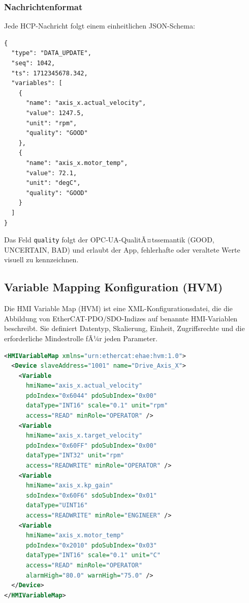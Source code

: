 ﻿\documentclass[12pt,a4paper]{article}
\begin{document}
\subsubsection{Nachrichtenformat}

Jede HCP-Nachricht folgt einem einheitlichen JSON-Schema:

\begin{lstlisting}[language={}, caption={HCP-Nachrichtenformat (Beispiel: DATA\_UPDATE).}]
{
  "type": "DATA_UPDATE",
  "seq": 1042,
  "ts": 1712345678.342,
  "variables": [
    {
      "name": "axis_x.actual_velocity",
      "value": 1247.5,
      "unit": "rpm",
      "quality": "GOOD"
    },
    {
      "name": "axis_x.motor_temp",
      "value": 72.1,
      "unit": "degC",
      "quality": "GOOD"
    }
  ]
}
\end{lstlisting}

Das Feld \texttt{quality} folgt der OPC-UA-QualitÃ¤tssemantik (GOOD, UNCERTAIN, BAD)
und erlaubt der App, fehlerhafte oder veraltete Werte visuell zu kennzeichnen.

\subsection{Variable Mapping Konfiguration (HVM)}

Die HMI Variable Map (HVM) ist eine XML-Konfigurationsdatei, die die Abbildung von
EtherCAT-PDO/SDO-Indizes auf benannte HMI-Variablen beschreibt. Sie definiert
Datentyp, Skalierung, Einheit, Zugriffsrechte und die erforderliche Mindestrolle fÃ¼r
jeden Parameter.

\begin{lstlisting}[language=xml, caption={HMI Variable Map (HVM) Konfigurationsbeispiel.}]
<HMIVariableMap xmlns="urn:ethercat:ehae:hvm:1.0">
  <Device slaveAddress="1001" name="Drive_Axis_X">
    <Variable
      hmiName="axis_x.actual_velocity"
      pdoIndex="0x6044" pdoSubIndex="0x00"
      dataType="INT16" scale="0.1" unit="rpm"
      access="READ" minRole="OPERATOR" />
    <Variable
      hmiName="axis_x.target_velocity"
      pdoIndex="0x60FF" pdoSubIndex="0x00"
      dataType="INT32" unit="rpm"
      access="READWRITE" minRole="OPERATOR" />
    <Variable
      hmiName="axis_x.kp_gain"
      sdoIndex="0x60F6" sdoSubIndex="0x01"
      dataType="UINT16"
      access="READWRITE" minRole="ENGINEER" />
    <Variable
      hmiName="axis_x.motor_temp"
      pdoIndex="0x2010" pdoSubIndex="0x03"
      dataType="INT16" scale="0.1" unit="C"
      access="READ" minRole="OPERATOR"
      alarmHigh="80.0" warnHigh="75.0" />
  </Device>
</HMIVariableMap>
\end{lstlisting}
\end{document}
